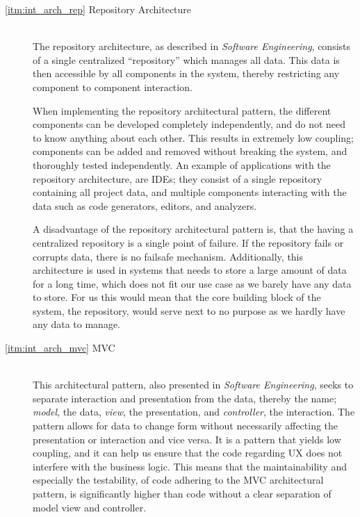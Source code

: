 \begin{description}
    \item[\ref{itm:int_arch_rep} Repository Architecture]\hfill\\
The repository architecture, as described in \textit{Software Engineering}\cite[p.~179-180]{sommerville}, consists of a single centralized \enquote{repository} which manages all data.
This data is then accessible by all components in the system, thereby restricting any component to component interaction.

When implementing the repository architectural pattern, the different components can be developed completely independently, and do not need to know anything about each other.
This results in extremely low coupling; components can be added and removed without breaking the system, and thoroughly tested independently.
An example of applications with the repository architecture, are IDEs; they consist of a single repository containing all project data, and multiple components interacting with the data such as code generators, editors, and analyzers.

A disadvantage of the repository architectural pattern is, that the having a centralized repository is a single point of failure.
If the repository fails or corrupts data, there is no failsafe mechanism.
Additionally, this architecture is used in systems that needs to store a large amount of data for a long time, which does not fit our use case as we barely have any data to store.
For us this would mean that the core building block of the system, the repository, would serve next to no purpose as we hardly have any data to manage.

\item[\ref{itm:int_arch_mvc} \acl{MVC}]\hfill\\
This architectural pattern, also presented in \textit{Software Engineering}\cite[p.~176]{sommerville}, seeks to separate interaction and presentation from the data, thereby the name; \textit{model}, the data, \textit{view}, the presentation, and \textit{controller}, the interaction.
The pattern allows for data to change form without necessarily affecting the presentation or interaction and vice versa.
It is a pattern that yields low coupling, and it can help us ensure that the code regarding \ac{UX} does not interfere with the business logic.
This means that the maintainability and especially the testability, of code adhering to the \ac{MVC} architectural pattern, is significantly higher than code without a clear separation of model view and controller.


\end{description}
